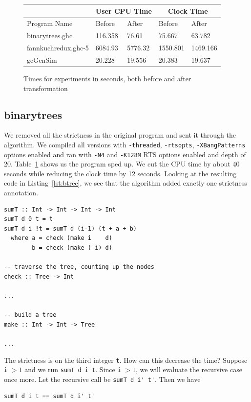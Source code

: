 \documentclass[preprint,nocopyrightspace]{sigplanconf}
\begin{document}
\begin{figure}[t]
\begin{tabular}{|l|l|l|l|l|}
\hline
 & \multicolumn{2}{|c|}{User CPU Time} & \multicolumn{2}{|c|}{Clock Time}\\
\hline
Program Name & Before & After & Before & After\\
\hline
binarytrees.ghc & 116.358 & 76.61 & 75.667 & 63.782\\
\hline
fannkuchredux.ghc-5 & 6084.93 & 5776.32 & 1550.801 & 1469.166\\
\hline
gcGenSim & 20.228 & 19.556 & 20.383 & 19.637\\
\hline
\end{tabular}
\label{tab:expr}
\caption{Times for experiments in seconds, both before and after transformation}
\end{figure}
\subsection{binarytrees}
We removed all the strictness in the original program and sent it through the algorithm. We compiled all versions with \lstinline!-threaded!, \lstinline!-rtsopts!, \lstinline!-XBangPatterns! options enabled and ran with \lstinline!-N4! and \lstinline!-K128M! RTS options enabled and depth of 20. Table~\ref{tab:expr} shows us the program sped up. We cut the CPU time by about 40 seconds while reducing the clock time by 12 seconds. Looking at the resulting code in Listing~\ref{lst:btree}, we see that the algorithm added exactly one strictness annotation.
\begin{lstlisting}[float,frame=single,caption=Changes in \lstinline!binarytrees! after applying the genetic algorithm,label=lst:btree]
sumT :: Int -> Int -> Int -> Int
sumT d 0 t = t
sumT d i !t = sumT d (i-1) (t + a + b)
  where a = check (make i    d)
        b = check (make (-i) d)

-- traverse the tree, counting up the nodes
check :: Tree -> Int

...

-- build a tree
make :: Int -> Int -> Tree

...
\end{lstlisting}
The strictness is on the third integer \lstinline!t!. How can this decrease the time? Suppose \lstinline!i! $ > 1$ and we run \lstinline!sumT d i t!. Since \lstinline!i! $ > 1$, we will evaluate the recursive case once more. Let the recursive call be \lstinline!sumT d i' t'!. Then we have 
\begin{lstlisting}
sumT d i t == sumT d i' t'
\end{lstlisting}
\end{document}
